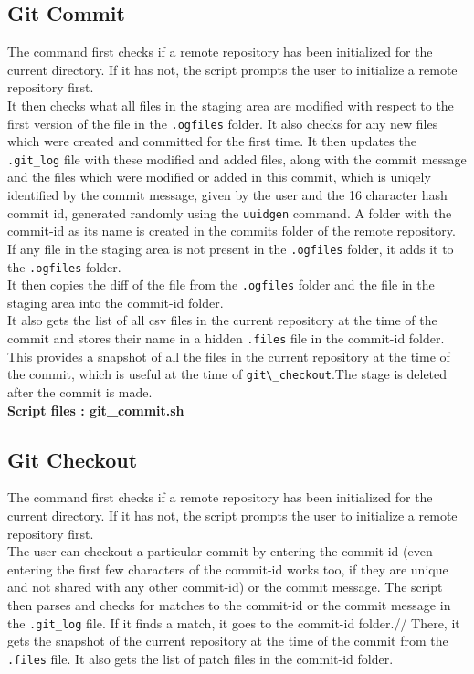 \documentclass{article}
\begin{document}
\subsection{Git Commit}
The command first checks if a remote repository has been initialized for the current directory. If it has not, the script prompts the user to initialize a remote repository first.\\
It then checks what all files in the staging area are modified with respect to the first version of the file in the \verb".ogfiles" folder. It also checks for any new files which were created and committed for the first time. It then updates the \verb".git_log" file with these modified and added files, along with the commit message and the files which were modified or added in this commit, which is uniqely identified by the commit message, given by the user and the 16 character hash commit id, generated randomly using the \verb"uuidgen" command. A folder with the commit-id as its name is created in the commits folder of the remote repository.\\

If any file in the staging area is not present in the \verb".ogfiles" folder, it adds it to the \verb".ogfiles" folder.\\ It then copies the diff of the file from the \verb".ogfiles" folder and the file in the staging area into the commit-id folder.\\

It also gets the list of all csv files in the current repository at the time of the commit and stores their name in a hidden \verb".files" file in the commit-id folder. This provides a snapshot of all the files in the current repository at the time of the commit, which is useful at the time of \verb"git\_checkout".The stage is deleted after the commit is made.\\

\textbf{Script files : git\_commit.sh}

\subsection{Git Checkout}
The command first checks if a remote repository has been initialized for the current directory. If it has not, the script prompts the user to initialize a remote repository first.\\
The user can checkout a particular commit by entering the commit-id (even entering the first few characters of the commit-id works too, if they are unique and not shared with any other commit-id) or the commit message. The script then parses and checks for matches to the commit-id or the commit message in the \verb".git_log" file. If it finds a match, it goes to the commit-id folder.//
There, it gets the snapshot of the current repository at the time of the commit from the \verb".files" file. It also gets the list of patch files in the commit-id folder.\\
\end{document}

